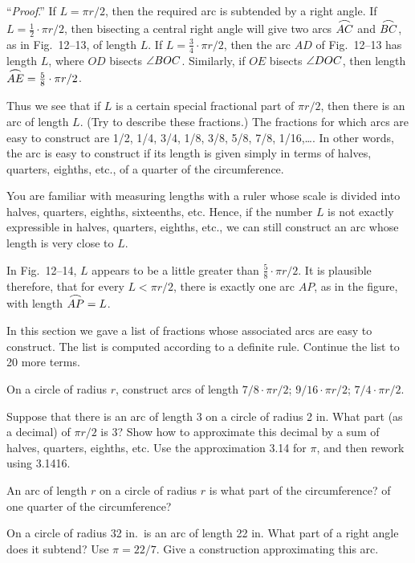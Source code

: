 \documentclass[11pt]{book}
\newcommand{\XIIarc}[1]{\overset{\raisebox{-0.25ex}{\scalebox{1.15}[0.85]{$\frown$}}}{#1}}
\begin{document}
\noindent``\emph{Proof}.'' If $L = \pi r/2$, then the required arc is subtended
by a right angle. If $L = \frac{1}{2} \cdot \pi r/2$, then bisecting a central
right angle will give two arcs $\XIIarc{AC}$ and $\XIIarc{BC}$, as in
Fig.~12--13, of length $L$. If $L = \frac{3}{4} \cdot \pi r/2$, then the arc
$AD$ of Fig.~12--13 has length $L$, where $OD$ bisects $\angle BOC$. Similarly,
if $OE$ bisects $\angle DOC$, then length $\XIIarc{AE} = \frac{5}{8} \cdot
\pi r/2$.

Thus we see that if $L$ is a certain special fractional part of $\pi r/2$, then
there is an arc of length $L$. (Try to describe these fractions.) The fractions
for which arcs are easy to construct are 1/2, 1/4, 3/4, 1/8, 3/8, 5/8, 7/8,
1/16,\ldots. In other words, the arc is easy to construct if its length is given
simply in terms of halves, quarters, eighths, etc., of a quarter of the
circumference.

\FIGXIITHIRTEENFOURTEEN

You are familiar with measuring lengths with a ruler whose scale is divided into
halves, quarters, eighths, sixteenths, etc. Hence, if the number $L$ is not
exactly expressible in halves, quarters, eighths, etc., we can still construct
an arc whose length is very close to $L$.

In Fig.~12--14, $L$ appears to be a little greater than $\frac{5}{8} \cdot
\pi r/2$. It is plausible therefore, that for every $L < \pi r/2$, there is
exactly one arc $AP$, as in the figure, with length $\XIIarc{AP} = L$.

\begin{exercisecols}
\begin{exlist}
\item In this section we gave a list of fractions whose associated arcs are easy
      to construct. The list is computed according to a definite rule. Continue
      the list to 20 more terms.
\item On a circle of radius $r$, construct arcs of length
      $7/8 \cdot \pi r/2$; $9/16 \cdot \pi r/2$; $7/4 \cdot \pi r/2$.
\item Suppose that there is an arc of length 3 on a circle of radius 2 in. What
      part (as a decimal) of $\pi r/2$ is 3? Show how to approximate this
      decimal by a sum of halves, quarters, eighths, etc. Use the approximation
      3.14 for $\pi$, and then rework using 3.1416.
\item An arc of length $r$ on a circle of radius $r$ is what part of the
      circumference? of one quarter of the circumference?
\item On a circle of radius 32 in.\ is an arc of length 22 in. What part of a
      right angle does it subtend? Use $\pi = 22/7$. Give a construction
      approximating this arc.
\end{exlist}
\end{exercisecols}
\end{document}

